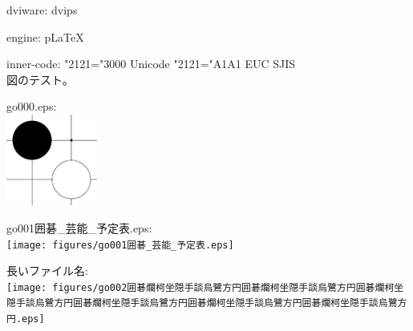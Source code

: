 \documentclass[autodetect-engine,twocolumn]{jsarticle}
\newif\ifuptexmode
\begin{document}
\parindent0mm

dviware: dvips

\ifuptexmode
engine: upLaTeX
\typeout{### engine: upLaTeX ###}
\else
engine: pLaTeX
\fi

inner-code: %
\ifnum\jis"2121="3000 Unicode%
\else
 \ifnum\jis"2121="A1A1
  EUC%
 \else
  SJIS%
\fi
\fi
\\

図のテスト。

go000.eps:\\
\includegraphics[width=30mm]{figures/go000.eps}

go001囲碁\_芸能\_予定表.eps:\\ %
\texttt{[image: figures/go001囲碁\_芸能\_予定表.eps]}

長いファイル名:\\
\texttt{[image: figures/go002囲碁爛柯坐隠手談烏鷺方円囲碁爛柯坐隠手談烏鷺方円囲碁爛柯坐隠手談烏鷺方円囲碁爛柯坐隠手談烏鷺方円囲碁爛柯坐隠手談烏鷺方円囲碁爛柯坐隠手談烏鷺方円.eps]}
\end{document}
